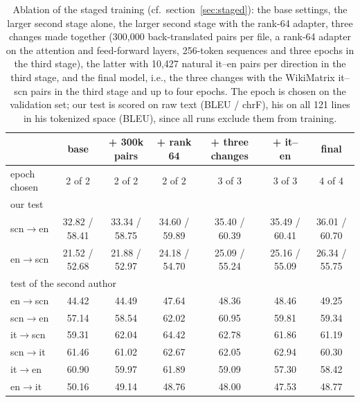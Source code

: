 \begin{table}[t]
\caption{Ablation of the staged training (cf.\ section~\ref{sec:staged}): the base settings,
the larger second stage alone, the larger second stage with the rank-64 adapter, three changes made together (300{,}000 back-translated pairs per file, a rank-64 adapter
on the attention and feed-forward layers, 256-token sequences and three epochs in the third
stage), the latter with 10{,}427 natural it--en pairs per direction in the third stage, and the final model, i.e., the three changes with the WikiMatrix it--scn pairs in the third stage and up to four epochs. The epoch is chosen on the validation set; our test is scored on raw text (BLEU / chrF),
his on all 121 lines in his tokenized space (BLEU), since all runs exclude them from training.}
\label{tab:ablation}
\centering
\footnotesize
\setlength{\tabcolsep}{3pt}
\begin{tabular}{lcccccc}
\toprule
 & base & + 300k pairs & + rank 64 & + three changes & + it--en & final \\
\midrule
epoch chosen & 2 of 2 & 2 of 2 & 2 of 2 & 3 of 3 & 3 of 3 & 4 of 4 \\
\midrule
\multicolumn{7}{l}{our test} \\
scn$\rightarrow$en & 32.82 / 58.41 & 33.34 / 58.75 & 34.60 / 59.89 & 35.40 / 60.39 & 35.49 / 60.41 & 36.01 / 60.70 \\
en$\rightarrow$scn & 21.52 / 52.68 & 21.88 / 52.97 & 24.18 / 54.70 & 25.09 / 55.24 & 25.16 / 55.09 & 26.34 / 55.75 \\
\midrule
\multicolumn{7}{l}{test of the second author} \\
en$\rightarrow$scn & 44.42 & 44.49 & 47.64 & 48.36 & 48.46 & 49.25 \\
scn$\rightarrow$en & 57.14 & 58.54 & 62.02 & 60.95 & 59.81 & 59.34 \\
it$\rightarrow$scn & 59.31 & 62.04 & 64.42 & 62.78 & 61.86 & 61.19 \\
scn$\rightarrow$it & 61.46 & 61.02 & 62.67 & 62.05 & 62.94 & 60.30 \\
it$\rightarrow$en  & 60.90 & 59.97 & 61.89 & 59.09 & 57.30 & 58.42 \\
en$\rightarrow$it  & 50.16 & 49.14 & 48.76 & 48.00 & 47.53 & 48.77 \\
\bottomrule
\end{tabular}
\end{table}
